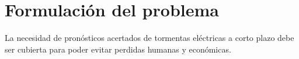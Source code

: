 \section{Formulación del problema}

La necesidad de pronósticos acertados de tormentas eléctricas a corto plazo debe
ser cubierta para poder evitar perdidas humanas y económicas.


